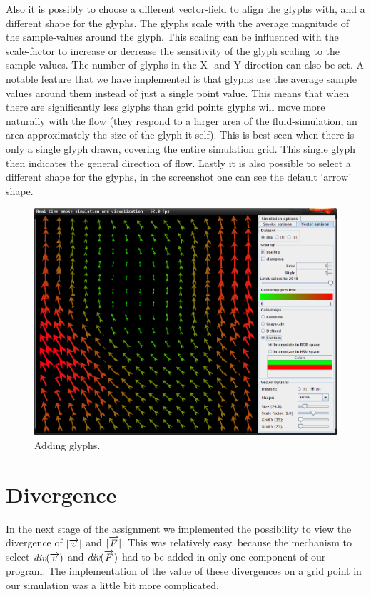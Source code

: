 \documentclass[a4paper,11pt,twoside]{report}
\begin{document}
		Also it is possibly to choose a different vector-field to align the glyphs with, and a different shape for the glyphs. The glyphs scale with the average magnitude of the sample-values around the glyph. This scaling can be influenced with the scale-factor to increase or decrease the sensitivity of the glyph scaling to the sample-values. The number of glyphs in the X- and Y-direction can also be set. A notable feature that we have implemented is that glyphs use the average sample values around them instead of just a single point value. This means that when there are significantly less glyphs than grid points glyphs will move more naturally with the flow (they respond to a larger area of the fluid-simulation, an area approximately the size of the glyph it self). This is best seen when there is only a single glyph drawn, covering the entire simulation grid. This single glyph then indicates the general direction of flow.
		Lastly it is also possible to select a different shape for the glyphs, in the screenshot one can see the default `arrow' shape.
		\begin{figure}[h]
		\centering
		\includegraphics[scale=\imagescalefactor]{images/step3.png}
		\caption{Adding glyphs.}\label{fig:step3}
		\end{figure}
		\clearpage
	\section{Divergence}
        In the next stage of the assignment we implemented the possibility to view the divergence of $|\overrightarrow{v}|$ and $|\overrightarrow{F}|$. This was relatively easy, because the mechanism to select $\textit{div}(\overrightarrow{v})$ and $\textit{div}(\overrightarrow{F})$ had to be added in only one component of our program. The implementation of the value of these divergences on a grid point in our simulation was a little bit more complicated.
\end{document}
